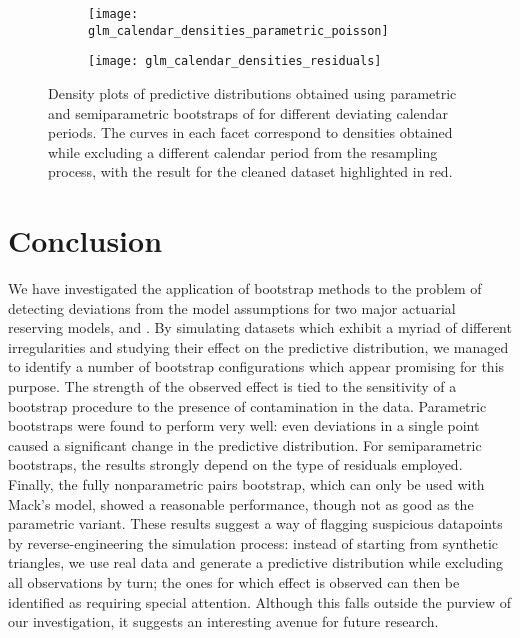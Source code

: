 \documentclass[a4paper]{book}
\begin{document}
\begin{landscape}
  \begin{figure}
    \begin{subfigure}{0.5\linewidth}
      \centering
      \texttt{[image: glm\_calendar\_densities\_parametric\_poisson]}
      \label{fig:odp-calendar-param-pois}
    \end{subfigure}
    \begin{subfigure}{0.5\linewidth}
      \centering
      \texttt{[image: glm\_calendar\_densities\_residuals]}
      \label{fig:odp-calendar-semiparam}
    \end{subfigure}
    \caption[Calendar outlier density plots for ODP model, semiparametric and parametric bootstrap]{Density plots of predictive distributions obtained using parametric and semiparametric bootstraps of  for different deviating calendar periods. The curves in each facet correspond to densities obtained while excluding a different calendar period from the resampling process, with the result for the cleaned dataset highlighted in red.}
  \end{figure}
\end{landscape}

\restoregeometry

\backmatter%

\chapter{Conclusion} \label{conclusion}

We have investigated the application of bootstrap methods to the problem of detecting deviations from the model assumptions for two major actuarial reserving models,  and . By simulating datasets which exhibit a myriad of different irregularities and studying their effect on the predictive distribution, we managed to identify a number of bootstrap configurations which appear promising for this purpose. The strength of the observed effect is tied to the sensitivity of a bootstrap procedure to the presence of contamination in the data. Parametric bootstraps were found to perform very well: even deviations in a single point caused a significant change in the predictive distribution. For semiparametric bootstraps, the results strongly depend on the type of residuals employed. Finally, the fully nonparametric pairs bootstrap, which can only be used with Mack's model, showed a reasonable performance, though not as good as the parametric variant. These results suggest a way of flagging suspicious datapoints by reverse-engineering the simulation process: instead of starting from synthetic triangles, we use real data and generate a predictive distribution while excluding all observations by turn; the ones for which effect is observed can then be identified as requiring special attention. Although this falls outside the purview of our investigation, it suggests an interesting avenue for future research.

\printbibliography%
\printindex
\end{document}
